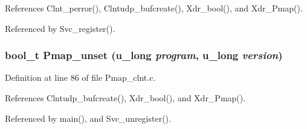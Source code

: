 References Clnt\_\-perror(), Clntudp\_\-bufcreate(), Xdr\_\-bool(), and Xdr\_\-Pmap().

Referenced by Svc\_\-register().
\subsubsection{\setlength{\rightskip}{0pt plus 5cm}bool\_\-t Pmap\_\-unset (u\_\-long {\em program}, u\_\-long {\em version})}\label{Pmap__clnt_8c_a4}




Definition at line 86 of file Pmap\_\-clnt.c.

References Clntudp\_\-bufcreate(), Xdr\_\-bool(), and Xdr\_\-Pmap().

Referenced by main(), and Svc\_\-unregister().
